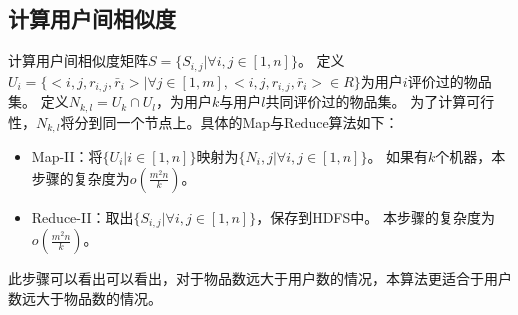 \subsection{计算用户间相似度}
计算用户间相似度矩阵$S=\{S_{i,j}|\forall i,j\in[1,n]\}$。
定义$U_i = \{<i,j,r_{i,j},\bar{r}_i>|\forall j \in [1,m],<i,j,r_{i,j},\bar{r}_i>\in R\}$为用户$i$评价过的物品集。
定义$N_{k,l} = U_k \cap U_l$，为用户$k$与用户$l$共同评价过的物品集。
为了计算可行性，$N_{k,l}$将分到同一个节点上。具体的Map与Reduce算法如下：
\begin{itemize}
\item Map-II：将$\{U_i|i\in [1,n]\}$映射为$\{N_i,j|\forall i,j\in [1,n]\}$。
如果有$k$个机器，本步骤的复杂度为$o(\frac{m^2n}{k})$。
\item Reduce-II：取出$\{S_{i,j}|\forall i,j\in [1,n]\}$，保存到HDFS中。
本步骤的复杂度为$o(\frac{m^2n}{k})$。
\end{itemize}
此步骤可以看出可以看出，对于物品数远大于用户数的情况，本算法更适合于用户数远大于物品数的情况。


